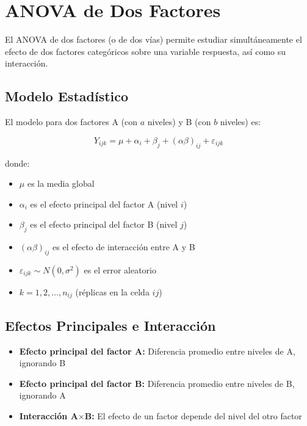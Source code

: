 \documentclass[11pt,a4paper]{article}
\theoremstyle{definition}
\begin{document}
\section{ANOVA de Dos Factores}

El ANOVA de dos factores (o de dos vías) permite estudiar simultáneamente el efecto de dos factores categóricos sobre una variable respuesta, así como su interacción.

\subsection{Modelo Estadístico}

El modelo para dos factores A (con $a$ niveles) y B (con $b$ niveles) es:

\begin{equation}
Y_{ijk} = \mu + \alpha_i + \beta_j + (\alpha\beta)_{ij} + \varepsilon_{ijk}
\end{equation}

donde:
\begin{itemize}
    \item $\mu$ es la media global
    \item $\alpha_i$ es el efecto principal del factor A (nivel $i$)
    \item $\beta_j$ es el efecto principal del factor B (nivel $j$)
    \item $(\alpha\beta)_{ij}$ es el efecto de interacción entre A y B
    \item $\varepsilon_{ijk} \sim N(0, \sigma^2)$ es el error aleatorio
    \item $k = 1, 2, \ldots, n_{ij}$ (réplicas en la celda $ij$)
\end{itemize}

\subsection{Efectos Principales e Interacción}

\begin{itemize}
    \item \textbf{Efecto principal del factor A:} Diferencia promedio entre niveles de A, ignorando B
    \item \textbf{Efecto principal del factor B:} Diferencia promedio entre niveles de B, ignorando A
    \item \textbf{Interacción A$\times$B:} El efecto de un factor depende del nivel del otro factor
\end{itemize}
\end{document}
